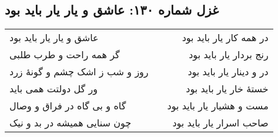 \begin{center}
\section*{غزل شماره ۱۳۰: عاشق و یار یار باید بود}
\label{sec:130}
\begin{longtable}{l p{0.5cm} r}
عاشق و یار یار باید بود
&&
در همه کار یار باید بود
\\
گر همه راحت و طرب طلبی
&&
رنج بردار یار باید بود
\\
روز و شب ز اشک چشم و گونهٔ زرد
&&
در و دینار یار باید بود
\\
ور گل دولتت همی باید
&&
خستهٔ خار یار باید بود
\\
گاه و بی گاه در فراق و وصال
&&
مست و هشیار یار باید بود
\\
چون سنایی همیشه در بد و نیک
&&
صاحب اسرار یار باید بود
\\
\end{longtable}
\end{center}
